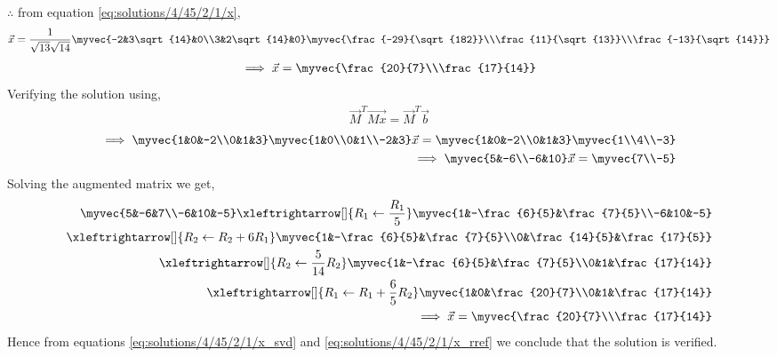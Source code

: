 $\therefore$ from equation \eqref{eq:solutions/4/45/2/1/x},
\begin{align}
\vec{x} = \frac{1}{\sqrt{13}\sqrt{14}}\myvec{-2&3\sqrt{14}&0\\3&2\sqrt{14}&0} \myvec{\frac{-29}{\sqrt{182}}\\\frac{11}{\sqrt{13}}\\\frac{-13}{\sqrt{14}}}\label{eq:solutions/4/45/2/1/fx}
\end{align} 
\begin{align}
\implies \vec{x} = \myvec{\frac{20}{7}\\\frac{17}{14}} \label{eq:solutions/4/45/2/1/x_svd}
\end{align}
Verifying the solution using,
\begin{align}
\vec{M}^T\vec{Mx} = \vec{M}^T\vec{b}
\end{align}
\begin{align}
\implies \myvec{1&0&-2\\0&1&3} \myvec{1&0\\0&1\\-2&3} \vec{x} = \myvec{1&0&-2\\0&1&3}\myvec{1\\4\\-3}\\
\implies \myvec{5&-6\\-6&10}\vec{x} = \myvec{7\\-5}
\end{align}
Solving the augmented matrix we get,
\begin{align}
\myvec{5&-6&7\\-6&10&-5}\xleftrightarrow[]{R_1\leftarrow\frac{R_1}{5}}\myvec{1&-\frac{6}{5}&\frac{7}{5}\\-6&10&-5}\\
\xleftrightarrow[]{R_2\leftarrow R_2+6R_1}\myvec{1&-\frac{6}{5}&\frac{7}{5}\\0&\frac{14}{5}&\frac{17}{5}}\\
\xleftrightarrow[]{R_2\leftarrow \frac{5}{14}R_2}\myvec{1&-\frac{6}{5}&\frac{7}{5}\\0&1&\frac{17}{14}}\\
\xleftrightarrow[]{R_1\leftarrow R_1+\frac{6}{5}R_2}\myvec{1&0&\frac{20}{7}\\0&1&\frac{17}{14}}\\
\implies \vec{x} = \myvec{\frac{20}{7}\\\frac{17}{14}}\label{eq:solutions/4/45/2/1/x_rref}
\end{align}
Hence from equations \eqref{eq:solutions/4/45/2/1/x_svd} and \eqref{eq:solutions/4/45/2/1/x_rref} we conclude that the solution is verified.  
